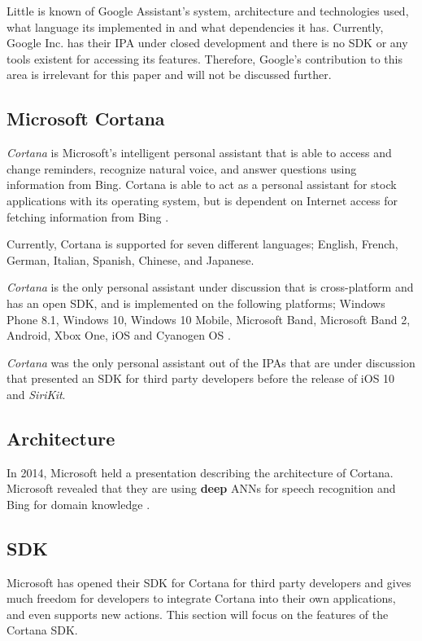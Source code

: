 \documentclass[preprint,12pt]{elsarticle}
\begin{document}
Little is known of Google Assistant's system, architecture and technologies used, what language its implemented in and what dependencies it has.
Currently, Google Inc. has their IPA under closed development and there is no SDK or any tools existent for accessing its features. 
Therefore, Google's contribution to this area is irrelevant for this paper and will not be discussed further.

\subsection{Microsoft Cortana}
\textit{Cortana} is Microsoft's intelligent personal assistant that is able to access and change reminders, recognize natural voice, and answer questions using information from Bing. Cortana is able to act as a personal assistant for stock applications with its operating system, but is dependent on Internet access for fetching information from Bing \cite{microsoftcortana2016}.

Currently, Cortana is supported for seven different languages; English, French, German, Italian, Spanish, Chinese, and Japanese.

\textit{Cortana} is the only personal assistant under discussion that is cross-platform and has an open SDK, and is implemented on the following platforms; Windows Phone 8.1, Windows 10, Windows 10 Mobile, Microsoft Band, Microsoft Band 2, Android, Xbox One, iOS and Cyanogen OS \cite{microsoftcortana2016}.

\textit{Cortana} was the only personal assistant out of the IPAs that are under discussion that presented an SDK for third party developers before the release of iOS 10 and \textit{SiriKit}.


\subsection{Architecture}
In 2014, Microsoft held a presentation describing the architecture of Cortana. Microsoft revealed that they are using \textbf{deep} ANNs for speech recognition and Bing for domain knowledge \cite{arstechnica2014}.

\subsection{SDK}
Microsoft has opened their SDK for Cortana for third party developers and gives much freedom for developers to integrate Cortana into their own applications, and even supports new actions. This section will focus on the features of the Cortana SDK. 
\end{document}
